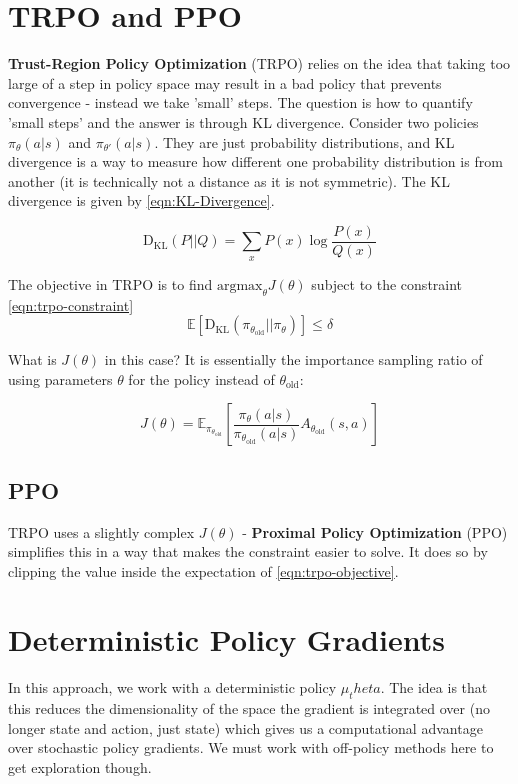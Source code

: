 \documentclass[11pt]{report}
\begin{document}
\section{TRPO and PPO}
\textbf{Trust-Region Policy Optimization} (TRPO) relies on the idea that taking too large of a step in policy space may result in a bad policy that prevents convergence - instead we take 'small' steps. The question is how to quantify 'small steps' and the answer is through KL divergence. Consider two policies $\pi_\theta(a | s)$ and $\pi_{\theta'}(a | s)$. They are just probability distributions, and KL divergence is a way to measure how different one probability distribution is from another (it is technically not a distance as it is not symmetric). The KL divergence is given by \autoref{eqn:KL-Divergence}.

\begin{equation}
	\label{eqn:KL-Divergence}
	\text{D}_{\text{KL}}(P|| Q) = \sum_{x} P(x) \log\frac{P(x)}{Q(x)}
\end{equation}

The objective in TRPO is to find $\text{argmax}_{\theta}J(\theta)$ subject to the constraint \autoref{eqn:trpo-constraint}
\begin{equation}
	\label{eqn:trpo-constraint}
	\mathbb{E}\left[ \text{D}_{\text{KL}}(\pi_{\theta_{\text{old}}} || \pi_{\theta}) \right] \le \delta
\end{equation}

What is $J(\theta)$ in this case? It is essentially the importance sampling ratio of using parameters $\theta$ for the policy instead of $\theta_{\text{old}}$:

\begin{equation}
	\label{eqn:trpo-objective}
	J(\theta) = \mathbb{E}_{\pi_{\theta_\text{old}}}\left[  \frac{\pi_{\theta}(a|s)}{\pi_{\theta_\text{old}}(a|s)} A_{\theta_{\text{old}}}(s, a) \right]
\end{equation}


\subsection{PPO}
TRPO uses a slightly complex $J(\theta)$ - \textbf{Proximal Policy Optimization} (PPO) simplifies this in a way that makes the constraint easier to solve. It does so by clipping the value inside the expectation of \autoref{eqn:trpo-objective}.


\section{Deterministic Policy Gradients}
In this approach, we work with a deterministic policy $\mu_theta$. The idea is that this reduces the dimensionality of the space the gradient is integrated over (no longer state and action, just state) which gives us a computational advantage over stochastic policy gradients. We must work with off-policy methods here to get exploration though.
\end{document}
